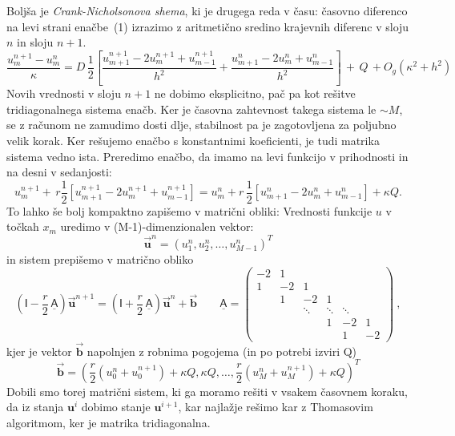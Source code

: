 \documentclass[slovene,11pt,a4paper]{article}
\begin{document}
Boljša je {\sl Crank-Nicholsonova shema}, ki je drugega reda v
času: časovno diferenco na levi strani enačbe~(1) izrazimo z
aritmetično sredino krajevnih diferenc v sloju $n$ in sloju $n+1$.
\[
\frac{u_{m}^{n+1}-u_{m}^{n}}{\kappa}=D\, \frac{1}{2} \left[ \frac{u_{m+1}^{n+1}-2 u_{m}^{n+1}+u_{m-1}^{n+1}}{h^{2}} + \frac{u_{m+1}^{n}-2 u_{m}^{n}+u_{m-1}^{n}}{h^{2}} \right]\, +\, Q \, +O_g\left(\kappa^{2}+h^{2}\right)
\]
Novih vrednosti v sloju $n+1$ ne dobimo eksplicitno, pač pa kot
rešitve tridiagonalnega sistema enačb. Ker je časovna zahtevnost
takega sistema le $\sim M$, se z računom ne zamudimo dosti dlje,
stabilnost pa je zagotovljena za poljubno velik korak. Ker rešujemo
enačbo s konstantnimi koeficienti, je tudi matrika sistema vedno
ista. Preredimo enačbo, da imamo na levi  funkcijo v prihodnosti in na desni v sedanjosti:
\[
u_{m}^{n+1} +\, r \frac{1}{2} \left[ u_{m+1}^{n+1}-2 u_{m}^{n+1}+u_{m-1}^{n+1} \right]= u_{m}^{n} + r\, \frac{1}{2} \left[ u_{m+1}^{n}-2 u_{m}^{n}+u_{m-1}^{n} \right] + \kappa Q . 
\]
To lahko še bolj kompaktno zapišemo v matrični obliki:
Vrednosti  funkcije $u$ v točkah $x_m$ uredimo v (M-1)-dimenzionalen vektor:
\begin{equation*}
\vec{\boldsymbol{u}}^n=(u_1^n,u_2^n,\ldots,u_{M-1}^n)^T
\end{equation*}
in sistem prepišemo v matrično obliko
\begin{equation*}
  \left(\mathsf{I}-\frac{r}{2}\,\mathsf{\underline A}\right)\vec{\boldsymbol{u}}^{n+1}=
  \left(\mathsf{I}+\frac{r}{2}\,\mathsf{\underline A}\right)\vec{\boldsymbol{u}}^{n} + \vec{\boldsymbol{b}} \qquad
  \mathsf{\underline A}=\begin{pmatrix}
  -2 & 1 \\
  1   & -2 & 1 \\
  & 1   & -2 & 1 \\
  & & \ddots & \ddots & \ddots \\
  & & & 1 & -2 & 1 \\
  & & & & 1 & -2
  \end{pmatrix}\>,
\end{equation*}
kjer je vektor $\vec{\boldsymbol{b}}$ napolnjen z robnima pogojema (in po potrebi izviri Q)
\begin{equation*}
  \vec{\boldsymbol{b}}= \left(\frac{r}{2}(u_0^n+u_0^{n+1})+\kappa Q,\kappa Q,\ldots,\frac{r}{2}(u_M^n+u_M^{n+1})+\kappa Q\right)^T
\end{equation*}
Dobili smo torej matrični sistem, ki ga moramo rešiti v vsakem časovnem koraku, da iz stanja $\boldsymbol{u}^i$ dobimo stanje $\boldsymbol{u}^{i+1}$, kar najlažje rešimo kar z Thomasovim algoritmom, ker je matrika tridiagonalna.
\end{document}

